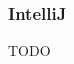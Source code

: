 \documentclass[FIPLY_base.tex]{subfiles}
\begin{document}
\subsubsection{IntelliJ}
TODO
\end{document}
